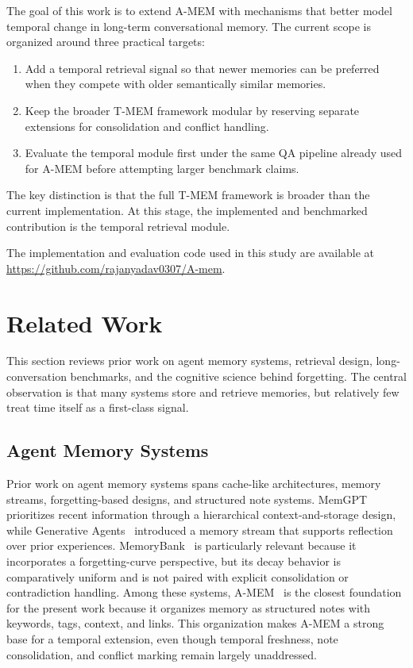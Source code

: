 \documentclass[conference]{IEEEtran}
\begin{document}
The goal of this work is to extend A-MEM with mechanisms that better model temporal change in long-term conversational memory. The current scope is organized around three practical targets:

\begin{enumerate}
    \item Add a temporal retrieval signal so that newer memories can be preferred when they compete with older semantically similar memories.
    \item Keep the broader T-MEM framework modular by reserving separate extensions for consolidation and conflict handling.
    \item Evaluate the temporal module first under the same QA pipeline already used for A-MEM before attempting larger benchmark claims.
\end{enumerate}

The key distinction is that the full T-MEM framework is broader than the current implementation. At this stage, the implemented and benchmarked contribution is the temporal retrieval module.

The implementation and evaluation code used in this study are available at \url{https://github.com/rajanyadav0307/A-mem}.

\section{Related Work}

This section reviews prior work on agent memory systems, retrieval design, long-conversation benchmarks, and the cognitive science behind forgetting. The central observation is that many systems store and retrieve memories, but relatively few treat time itself as a first-class signal.

\subsection{Agent Memory Systems}

Prior work on agent memory systems spans cache-like architectures, memory streams, forgetting-based designs, and structured note systems. MemGPT~\cite{packer2023memgpt} prioritizes recent information through a hierarchical context-and-storage design, while Generative Agents~\cite{park2023generative} introduced a memory stream that supports reflection over prior experiences. MemoryBank~\cite{zhong2024memorybank} is particularly relevant because it incorporates a forgetting-curve perspective, but its decay behavior is comparatively uniform and is not paired with explicit consolidation or contradiction handling. Among these systems, A-MEM~\cite{xu2025amem} is the closest foundation for the present work because it organizes memory as structured notes with keywords, tags, context, and links. This organization makes A-MEM a strong base for a temporal extension, even though temporal freshness, note consolidation, and conflict marking remain largely unaddressed.
\end{document}
